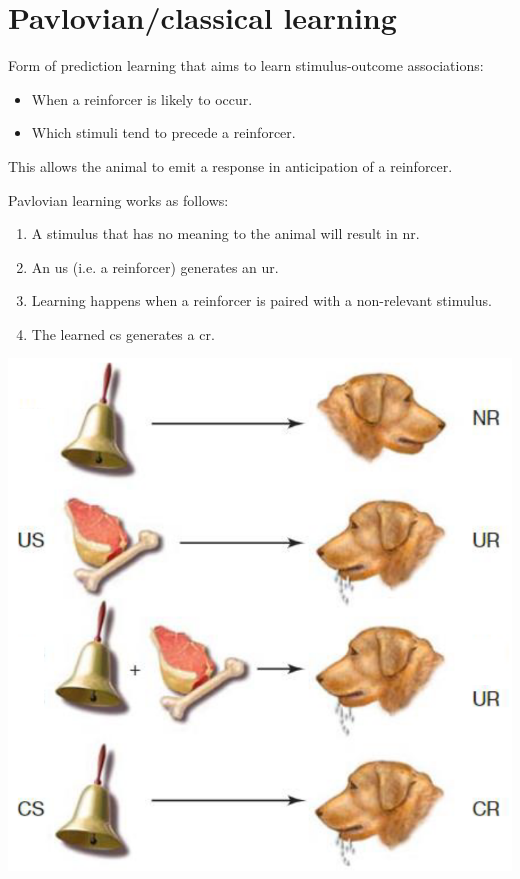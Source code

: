 \chapter{Pavlovian/classical learning}


Form of prediction learning that aims to learn stimulus-outcome associations:
\begin{itemize}
    \item When a reinforcer is likely to occur.
    \item Which stimuli tend to precede a reinforcer.
\end{itemize}
This allows the animal to emit a response in anticipation of a reinforcer.

Pavlovian learning works as follows:\\
\begin{minipage}{0.58\linewidth}
    \begin{enumerate}[label=\alph*.]
        \item A stimulus that has no meaning to the animal will result in \ac{nr}.
        \item An \ac{us} (i.e. a reinforcer) generates an \ac{ur}.
        \item Learning happens when a reinforcer is paired with a non-relevant stimulus.
        \item The learned \ac{cs} generates a \ac{cr}.
    \end{enumerate}
\end{minipage}
\begin{minipage}{0.4\linewidth}
    \raggedleft
    \includegraphics[width=0.9\linewidth]{./img/pavlovian_example.png}
\end{minipage}\\


